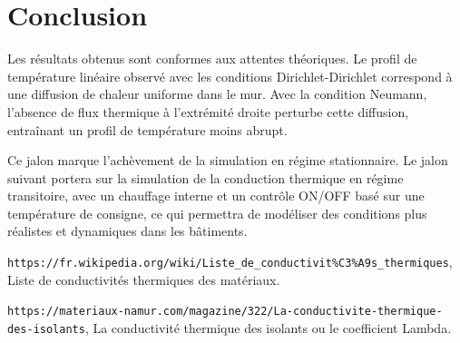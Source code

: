 \documentclass[a4paper,11pt]{article}
\begin{document}
\section{Conclusion}
Les résultats obtenus sont conformes aux attentes théoriques. Le profil de température linéaire observé avec les conditions Dirichlet-Dirichlet correspond à une diffusion de chaleur uniforme dans le mur. Avec la condition Neumann, l'absence de flux thermique à l'extrémité droite perturbe cette diffusion, entraînant un profil de température moins abrupt.

Ce jalon marque l'achèvement de la simulation en régime stationnaire. Le jalon suivant portera sur la simulation de la conduction thermique en régime transitoire, avec un chauffage interne et un contrôle ON/OFF basé sur une température de consigne, ce qui permettra de modéliser des conditions plus réalistes et dynamiques dans les bâtiments.

\begin{thebibliography}{9}
     \texttt{https://fr.wikipedia.org/wiki/Liste\_de\_conductivit\%C3\%A9s\_thermiques}, Liste de conductivités thermiques des matériaux.

     \texttt{https://materiaux-namur.com/magazine/322/La-conductivite-thermique-des-isolants}, La conductivité thermique des isolants ou le coefficient Lambda.
    
    \end{thebibliography}
\end{document}
